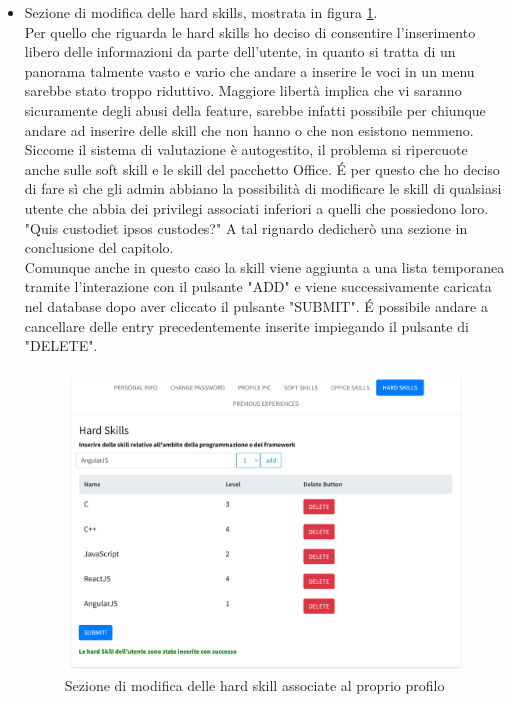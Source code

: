 \begin{itemize}
    \item Sezione di modifica delle hard skills, mostrata in figura \ref{fig:hardSkills}.
    \\
    Per quello che riguarda le hard skills ho deciso di consentire l'inserimento libero delle informazioni da parte dell'utente, in quanto si tratta di un panorama talmente vasto e vario che andare a inserire le voci in un menu sarebbe stato troppo riduttivo. Maggiore libertà implica che vi saranno sicuramente degli abusi della feature, sarebbe infatti possibile per chiunque andare ad inserire delle skill che non hanno o che non esistono nemmeno.
    \\
    Siccome il sistema di valutazione è autogestito, il problema si ripercuote anche sulle soft skill e le skill del pacchetto Office. \'E  per questo che ho deciso di fare sì che gli admin abbiano la possibilità di modificare le skill di qualsiasi utente che abbia dei privilegi associati inferiori a quelli che possiedono loro. "Quis custodiet ipsos custodes?" A tal riguardo dedicherò una sezione in conclusione del capitolo.
    \\
    Comunque anche in questo caso la skill viene aggiunta a una lista temporanea tramite l'interazione con il pulsante "ADD" e viene successivamente caricata nel database dopo aver cliccato il pulsante "SUBMIT". \'E possibile andare a cancellare delle entry precedentemente inserite impiegando il pulsante di "DELETE".
    \begin{figure}[h]
        \centering
        \includegraphics[width=450px]{./images/hard_skills.png}
        \caption{Sezione di modifica delle hard skill associate al proprio profilo}
        \label{fig:hardSkills}
    \end{figure}
    

\end{itemize}
